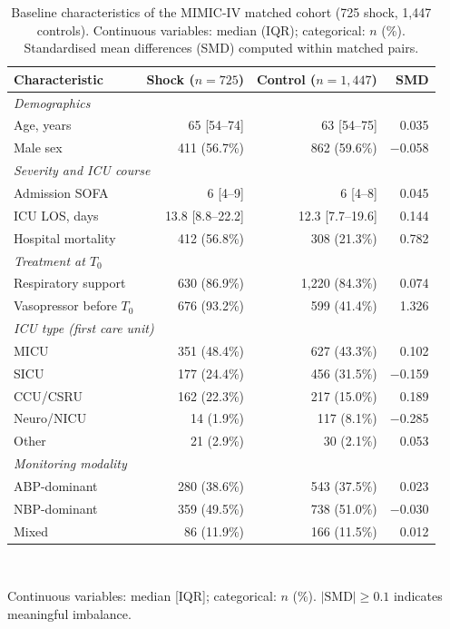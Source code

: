 \documentclass[12pt,a4paper]{article}
\newcommand{\Tzero}{$T_0$}
\begin{document}
\clearpage

\begin{table}[htbp]
  \centering
  \caption{Baseline characteristics of the MIMIC-IV matched cohort
  (725 shock, 1,447 controls).
  Continuous variables: median (IQR); categorical: $n$ (\%).
  Standardised mean differences (SMD) computed within matched pairs.}
  \label{tab:baseline}
  \small
  \begin{tabular}{lrrr}
    \toprule
    \textbf{Characteristic} & \textbf{Shock ($n=725$)} &
    \textbf{Control ($n=1{,}447$)} & \textbf{SMD} \\
    \midrule
    \multicolumn{4}{l}{\textit{Demographics}} \\
    Age, years            & 65 [54--74] & 63 [54--75] & 0.035 \\
    Male sex              & 411 (56.7\%) & 862 (59.6\%) & $-$0.058 \\
    \midrule
    \multicolumn{4}{l}{\textit{Severity and ICU course}} \\
    Admission SOFA        & 6 [4--9] & 6 [4--8] & 0.045 \\
    ICU LOS, days         & 13.8 [8.8--22.2] & 12.3 [7.7--19.6] & 0.144 \\
    Hospital mortality    & 412 (56.8\%) & 308 (21.3\%) & 0.782 \\
    \midrule
    \multicolumn{4}{l}{\textit{Treatment at \Tzero}} \\
    Respiratory support   & 630 (86.9\%) & 1{,}220 (84.3\%) & 0.074 \\
    Vasopressor before \Tzero & 676 (93.2\%) & 599 (41.4\%) & 1.326 \\
    \midrule
    \multicolumn{4}{l}{\textit{ICU type (first care unit)}} \\
    MICU                  & 351 (48.4\%) & 627 (43.3\%) & 0.102 \\
    SICU                  & 177 (24.4\%) & 456 (31.5\%) & $-$0.159 \\
    CCU/CSRU              & 162 (22.3\%) & 217 (15.0\%) & 0.189 \\
    Neuro/NICU            & 14 (1.9\%)  & 117 (8.1\%)  & $-$0.285 \\
    Other                 & 21 (2.9\%)  & 30 (2.1\%)  & 0.053 \\
    \midrule
    \multicolumn{4}{l}{\textit{Monitoring modality}} \\
    ABP-dominant          & 280 (38.6\%) & 543 (37.5\%) & 0.023 \\
    NBP-dominant          & 359 (49.5\%) & 738 (51.0\%) & $-$0.030 \\
    Mixed                 & 86 (11.9\%) & 166 (11.5\%) & 0.012 \\
    \bottomrule
  \end{tabular}
  \vspace{2pt}\\
  \raggedright\footnotesize
  Continuous variables: median [IQR]; categorical: $n$ (\%).
  $|\text{SMD}| \geq 0.1$ indicates meaningful imbalance.
\end{table}
\end{document}
